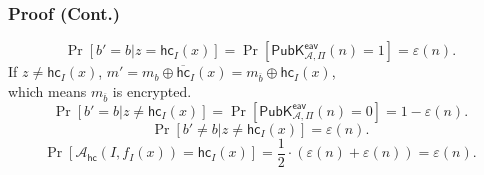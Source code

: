 \begin{frame}\frametitle{Proof (Cont.)}
\[\Pr[b'=b|z=\mathsf{hc}_I(x)] = \Pr[\mathsf{PubK}^{\mathsf{eav}}_{\mathcal{A},\Pi}(n)=1]=\varepsilon(n).\]
If $z \neq \mathsf{hc}_I(x)$, $m' = m_b\oplus \overline{\mathsf{hc}}_I(x) = m_{\overline{b}}\oplus \mathsf{hc}_I(x)$,\\ which means $m_{\overline{b}}$ is encrypted.
\[\Pr[b'=b|z\neq \mathsf{hc}_I(x)] = \Pr[\mathsf{PubK}^{\mathsf{eav}}_{\mathcal{A},\Pi}(n)=0]=1-\varepsilon(n).\]
\[\Pr[b'\neq b|z\neq \mathsf{hc}_I(x)] =\varepsilon(n).\]
\[\Pr[\mathcal{A}_{\mathsf{hc}}(I,f_I(x))=\mathsf{hc}_I(x)] = \frac{1}{2}\cdot (\varepsilon(n)+\varepsilon(n)) = \varepsilon(n).\]
\end{frame}
%
%
